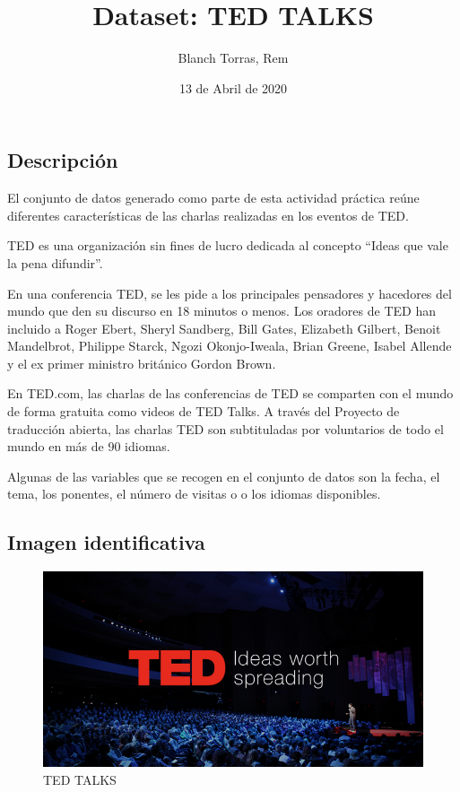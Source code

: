 \documentclass[
]{article}
\title{Dataset: TED TALKS}
\author{Blanch Torras, Rem}
\date{13 de Abril de 2020}
\begin{document}
\maketitle

\hypertarget{descripciuxf3n}{%
\subsection{Descripción}\label{descripciuxf3n}}

El conjunto de datos generado como parte de esta actividad práctica
reúne diferentes características de las charlas realizadas en los
eventos de TED.

TED es una organización sin fines de lucro dedicada al concepto ``Ideas
que vale la pena difundir''.

En una conferencia TED, se les pide a los principales pensadores y
hacedores del mundo que den su discurso en 18 minutos o menos. Los
oradores de TED han incluido a Roger Ebert, Sheryl Sandberg, Bill Gates,
Elizabeth Gilbert, Benoit Mandelbrot, Philippe Starck, Ngozi
Okonjo-Iweala, Brian Greene, Isabel Allende y el ex primer ministro
británico Gordon Brown.

En TED.com, las charlas de las conferencias de TED se comparten con el
mundo de forma gratuita como videos de TED Talks. A través del Proyecto
de traducción abierta, las charlas TED son subtituladas por voluntarios
de todo el mundo en más de 90 idiomas.

Algunas de las variables que se recogen en el conjunto de datos son la
fecha, el tema, los ponentes, el número de visitas o o los idiomas
disponibles.

\hypertarget{imagen-identificativa}{%
\subsection{Imagen identificativa}\label{imagen-identificativa}}

\begin{figure}
\centering
\includegraphics{./TED_banner.png}
\caption{TED TALKS}
\end{figure}
\end{document}
